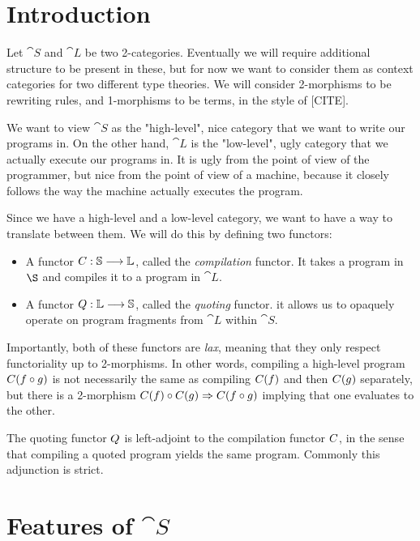 \section{Introduction}

Let $\cat S$ and $\cat L$ be two 2-categories. Eventually we will require
additional structure to be present in these, but for now we want to consider
them as context categories for two different type theories. We will consider
2-morphisms to be rewriting rules, and 1-morphisms to be terms, in the style of
  [CITE].

We want to view $\cat S$ as the "high-level", nice category that we want to
write our programs in. On the other hand, $\cat L$ is the "low-level", ugly
category that we actually execute our programs in. It is ugly from the point of
view of the programmer, but nice from the point of view of a machine, because
it closely follows the way the machine actually executes the program.

Since we have a high-level and a low-level category, we want to have a way to
translate between them. We will do this by defining two functors:
\begin{itemize}
  \item A functor $ C : \mathbb S \longrightarrow \mathbb L $, called the \emph{compilation}
        functor. It takes a program in $\S$ and compiles it to a program in $\cat L$.
  \item A functor $ Q : \mathbb L \longrightarrow \mathbb S $, called the \emph{quoting}
        functor. it allows us to opaquely operate on program fragments from $\cat L$
        within $\cat S$.
\end{itemize}

Importantly, both of these functors are \emph{lax}, meaning that they only
respect functoriality up to 2-morphisms. In other words, compiling a high-level
program $ C(f \circ g)$ is not necessarily the same as compiling $
  C(f)$ and then $ C(g)$ separately, but there is a 2-morphism $ C(f)
  \circ  C(g) \Rightarrow  C(f \circ g)$ implying that one evaluates to
the other.

The quoting functor $ Q$ is left-adjoint to the compilation functor $
  C$, in the sense that compiling a quoted program yields the same program.
Commonly this adjunction is strict.

\section{Features of $\cat S$}

